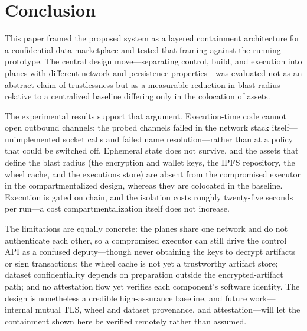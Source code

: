 
\section{Conclusion}
\label{sec:conclusion}

This paper framed the proposed system as a layered containment architecture for a
confidential data marketplace and tested that framing against the running prototype. The
central design move---separating control, build, and execution into planes with different
network and persistence properties---was evaluated not as an abstract claim of trustlessness
but as a measurable reduction in blast radius relative to a centralized baseline differing
only in the colocation of assets.

The experimental results support that argument. Execution-time code cannot open outbound
channels: the probed channels failed in the network stack itself---unimplemented socket
calls and failed name resolution---rather than at a policy that could be switched off.
Ephemeral state does not survive, and the assets that define the blast radius (the
encryption and wallet keys, the IPFS repository, the wheel cache, and the executions store)
are absent from the compromised executor in the compartmentalized design, whereas they are
colocated in the baseline. Execution is gated on chain, and the isolation costs roughly
twenty-five seconds per run---a cost compartmentalization itself does not increase.

The limitations are equally concrete: the planes share one network and do not authenticate
each other, so a compromised executor can still drive the control API as a confused
deputy---though never obtaining the keys to decrypt artifacts or sign transactions; the
wheel cache is not yet a trustworthy artifact store; dataset confidentiality depends on
preparation outside the encrypted-artifact path; and no attestation flow yet verifies each
component's software identity. The design is nonetheless a credible high-assurance baseline,
and future work---internal mutual TLS, wheel and dataset provenance, and attestation---will
let the containment shown here be verified remotely rather than assumed.
